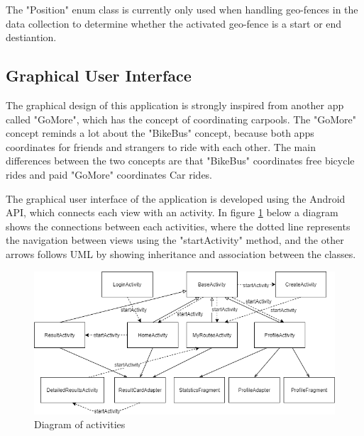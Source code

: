 The "Position" enum class is currently only used when handling geo-fences in the data collection to determine whether the activated geo-fence is a start or end destiantion.

\subsection{Graphical User Interface}
The graphical design of this application is strongly inspired from another app called "GoMore", which has the concept of coordinating carpools. The "GoMore" concept reminds a lot about the "BikeBus" concept, because both apps coordinates for friends and strangers to ride with each other. The main differences between the two concepts are that "BikeBus" coordinates free bicycle rides and paid "GoMore" coordinates Car rides.

The graphical user interface of the application is developed using the Android API, which connects each view with an activity. In figure \ref{fig:activities} below a diagram shows the connections between each activities, where the dotted line represents the navigation between views using the "startActivity" method, and the other arrows follows UML by showing inheritance and association between the classes.   

\begin{figure}[H]
    \centering
    \includegraphics[scale=0.45]{Graphics/Images/Activity_Diagram.png}
    \caption{Diagram of activities}
    \label{fig:activities}
\end{figure}

